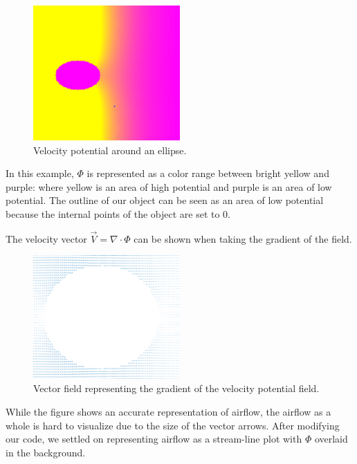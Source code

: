 \documentclass[11pt]{article}
\begin{document}
\begin{figure} [H] %
	\centering
	\includegraphics[width=0.5\textwidth]{flow.png}
	\caption{Velocity potential around an ellipse.}
\end{figure}
In this example, $\Phi$ is represented as a color range between bright yellow and purple: where yellow is an area of high potential and purple is an area of low potential. The outline of our object can be seen as an area of low potential because the internal points of the object are set to 0.

The velocity vector $\vec{V}=\nabla\cdot\Phi$  can be shown when taking the gradient of the field.
\begin{figure} [H] %
	\centering
	\includegraphics[width=0.5\textwidth]{flow_vec.png}
	\caption{Vector field representing the gradient of the velocity potential field.}
\end{figure}
While the figure shows an accurate representation of airflow, the airflow as a whole is hard to visualize due to the size of the vector arrows. After modifying our code, we settled on representing airflow as a stream-line plot with $\Phi$ overlaid in the background.
\end{document}
